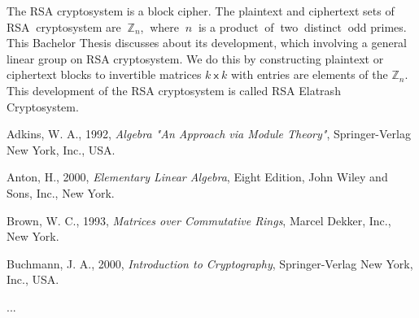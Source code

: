 \documentclass[skripsi]{unhasskripsi}
\theoremstyle{definition}
\begin{document}
\begin{abstracteng}
The RSA cryptosystem is a block cipher. The plaintext and ciphertext sets of RSA $\ $cryptosystem are $\ \mathbb{Z}_{n}$, $\ $where $\ n\ $ is a product $\ $of $\ $two $\ $distinct $\ $odd primes.$\ $ This Bachelor Thesis discusses about its development, which involving a general linear group on RSA cryptosystem. We do this by constructing plaintext or ciphertext blocks to invertible matrices \mbox{$k \ \mathsf{x} \ k$} with entries are elements of the $\mathbb{Z}_{n}$. This development of the RSA cryptosystem is called RSA Elatrash Cryptosystem.
\end{abstracteng}








\begin{thebibliography}{99}
Adkins, W. A., 1992, \emph{Algebra "An Approach via Module Theory"},  Springer-Verlag New York, Inc., USA.

Anton, H., 2000, \emph{Elementary Linear Algebra}, Eight Edition,  John Wiley and Sons, Inc., New York.

Brown, W. C., 1993, \emph{Matrices over Commutative Rings}, Marcel Dekker, Inc., New York.

Buchmann, J. A., 2000, \emph{Introduction to Cryptography}, Springer-Verlag New York, Inc., USA.

...
\end{thebibliography}
\end{document}
